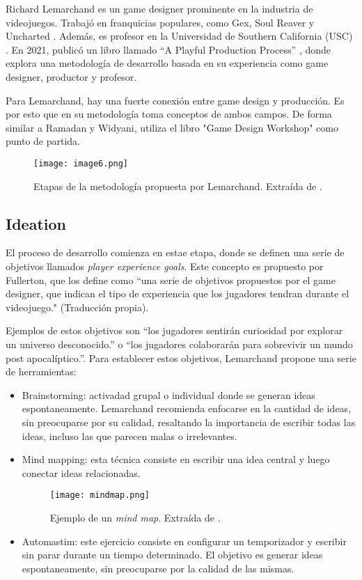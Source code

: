 %
%
\par Richard Lemarchand es un game designer prominente en la industria de videojuegos. Trabajó en franquicias populares, como Gex, Soul Reaver y Uncharted \cite{RichardLemarchandcom}. Además, es profesor en la Universidad de Southern California (USC) \cite{RichardLemarchandcom}. En 2021, publicó un libro llamado “A Playful Production Process” \cite{lemarchandPlayfulProductionProcess2021}, donde explora una metodología de desarrollo basada en su experiencia como game designer, productor y profesor. %
\par Para Lemarchand, hay una fuerte conexión entre game design y producción. Es por esto que en su metodología toma conceptos de ambos campos. De forma similar a Ramadan y Widyani, utiliza el libro "Game Design Workshop" \cite{fullertonGameDesignWorkshop2008} como punto de partida.
%
\begin{figure}[H]
  \centering
  \texttt{[image: image6.png]}
  \caption{Etapas de la metodología propuesta por Lemarchand. Extraída de \cite{lemarchandPlayfulProductionProcess2021}.}
  \label{fig:x proceso de desarrollo Lemarchand}
\end{figure}
%
%
%
\subsection{Ideation}
El proceso de desarrollo comienza en estae etapa, donde se definen una serie de objetivos llamados \textit{player experience goals}. Este concepto es propuesto por Fullerton, que los define como ``una serie de objetivos propuestos por el game designer, que indican el tipo de experiencia que los jugadores tendran durante el videojuego." \cite{fullertonGameDesignWorkshop2008} (Traducción propia).
\par Ejemplos de estos objetivos son ``los jugadores sentirán curiosidad por explorar un universo desconocido.'' o ``los jugadores colaborarán para sobrevivir un mundo post apocalíptico.''. Para establecer estos objetivos, Lemarchand propone una serie de herramientas:
\begin{itemize}
    \item Brainstorming: activadad grupal o individual donde se generan ideas espontaneamente. Lemarchand recomienda enfocarse en la cantidad de ideas, sin preocuparse por su calidad, resaltando la importancia de escribir todas las ideas, incluso las que parecen malas o irrelevantes.
    \item Mind mapping: esta técnica consiste en escribir una idea central y luego conectar ideas relacionadas. 
    \begin{figure}[H]
        \centering
        \texttt{[image: mindmap.png]}
        \caption{Ejemplo de un \textit{mind map}. Extraída de \cite{lemarchandPlayfulProductionProcess2021}.}
        \label{fig:x ejemplo de un mind map Lemarchand}
    \end{figure} 
    \item Automastim: este ejercicio consiste en configurar un temporizador y escribir sin parar durante un tiempo determinado. El objetivo es generar ideas espontaneamente, sin preocuparse por la calidad de las mismas.
\end{itemize}
%
%
